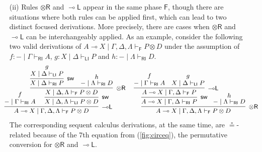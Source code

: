 \documentclass[copyright,creativecommons]{eptcs}
\theoremstyle{definition}
\newcommand{\tr}{\otimes \mathsf{R}}
\newcommand{\lleft}{{\multimap}\mathsf{L}}
\newcommand{\ot}{\otimes}
\newcommand{\lolli}{\multimap}
\newcommand{\RI}{\mathsf{RI}}
\newcommand{\LI}{\mathsf{LI}}
\newcommand{\F}{\mathsf{F}}
\newcommand{\proofbox}[1]{\begin{tabular}{l} #1 \end{tabular}}
\begin{document}
\begin{enumerate}
  \item[(ii)] Rules $\tr$ and $\lleft$ appear in the same phase $\F$, though there are situations where both rules can be applied first, which can lead to two distinct focused derivations. More precisely, there are cases when $\tr$ and $\lleft$ can be interchangeably applied. As an example, consider the following two valid derivations of $A \lolli X \mid \Gamma , \Delta , \Lambda \vdash_{\F} P \ot D$ under the assumption of $f : {-} \mid \Gamma \vdash_{\RI} A$, $g : X \mid \Delta \vdash_{\LI} P$ and $h : {-} \mid \Lambda \vdash_{\RI} D$.
    \begin{equation}\label{eq:llefttr}
\small
      \hspace{-.5cm}
      \proofbox{
      \infer[\lleft]{A \lolli X \mid \Gamma , \Delta , \Lambda \vdash_{\F} P \ot D}{
        \deduce{{-} \mid \Gamma \vdash_{\RI} A}{f}
        &\hspace{-.6cm}
        \infer[\mathsf{sw}]{X \mid \Delta , \Lambda \vdash_{\LI} P \ot D}{
          \infer[\tr]{X \mid \Delta , \Lambda \vdash_{\F} P\ot D}{
            \infer[\mathsf{sw}]{X \mid \Delta \vdash_{\RI} P}{
              \deduce{X \mid \Delta \vdash_{\LI} P}{g}
            }
            &
            \deduce{{-} \mid \Lambda \vdash_{\RI} D}{h}
          }
        }
      }
      \hspace{.2cm}
      \infer[\tr]{A \lolli X \mid \Gamma , \Delta , \Lambda \vdash_{\F} P \ot D}{
        \infer[\mathsf{sw}]{A \lolli X \mid \Gamma , \Delta \vdash_{\RI} P}{
          \infer[\lleft]{A \lolli X \mid \Gamma , \Delta \vdash_{\F} P}{
            \deduce{{-} \mid \Gamma \vdash_{\RI} A}{f}
            &
            \deduce{X \mid \Delta \vdash_{\LI} P}{g}
          }
        }
        &\hspace{-.6cm}
        \deduce{{-} \mid \Lambda \vdash_{\RI} D}{h}
      }
    }
    \end{equation}
    The corresponding sequent calculus derivations, at the same time, are $\circeq$-related because of the 7th equation from (\ref{fig:circeq}), the permutative conversion for $\tr$ and $\lleft$.
\end{enumerate}
\end{document}
